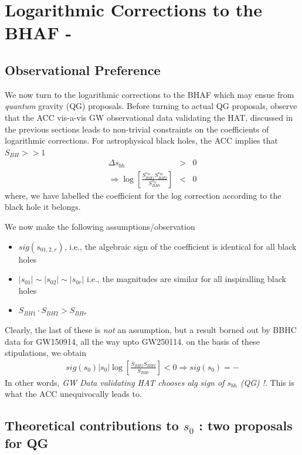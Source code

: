 \documentclass[11pt]{article}
\begin{document}
\section{Logarithmic Corrections to the BHAF \cite{pm2024}-\cite{pm2026}}

\subsection{Observational Preference}

We now turn to the logarithmic corrections to the BHAF which may ensue from {\it quantum} gravity (QG) proposals. Before turning to actual QG proposals, observe that the ACC vis-a-vis GW observational data validating the HAT, discussed in the previous sections leads to non-trivial constraints on the coefficients of logarithmic corrections. For astrophysical black holes, the ACC implies that $S_{BH} >> 1$ 
\begin{eqnarray}
\Delta s_{bh} &>& 0 \\ \nonumber
\Rightarrow \log \left[ \frac{ S_{BH1}^{s_{01}} S_{BH2}^{s_{02}}}{S_{BHr}^{s_{0r}}} \right] &<& 0 \label{logcor}
\end{eqnarray}
where, we have labelled the coefficient for the log correction according to the black hole it belongs. 

We now make the following assumptions/observation
\begin{itemize}
\item { $sig(s_{01,2,r})$, i.e., the algebraic sign of the coefficient is identical for all black holes}
\item { $|s_{01}| \sim |s_{02}| \sim |s_{0r}|$ i.e., the magnitudes are similar for all inspiralling black holes}
\item { $S_{BH1} \cdot S_{BH2} > S_{BHr}$} 
\end{itemize}
Clearly, the last of these is {\it not} an assumption, but a result borned out by BBHC data for GW150914, all the way upto GW250114. on the basis of these stipulations, we obtain
\begin{eqnarray}
sig(s_0) |s_0| \log \left[ \frac{ S_{BH1} S_{BH2} }{S_{BHr}} \right] < 0 \Rightarrow sig(s_0) = -
\end{eqnarray}
In other words, {\it GW Data validating HAT  chooses alg sign of $s_{bh}$ (QG) !}. This is what the ACC unequivocally leads to.  

\subsection{Theoretical contributions to $s_0$ : two proposals for QG}
\end{document}
